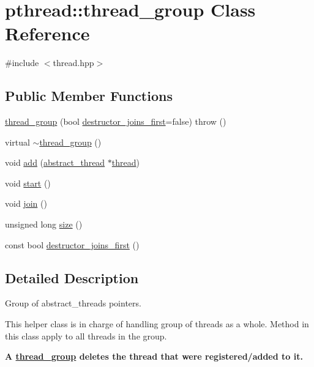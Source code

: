 \hypertarget{classpthread_1_1thread__group}{}\section{pthread\+:\+:thread\+\_\+group Class Reference}
\label{classpthread_1_1thread__group}


{\ttfamily \#include $<$thread.\+hpp$>$}

\subsection*{Public Member Functions}
\begin{DoxyCompactItemize}
\item 
\hyperlink{classpthread_1_1thread__group_a9e9881c6e01fda143a3f0080f0a196d8}{thread\+\_\+group} (bool \hyperlink{classpthread_1_1thread__group_a67df7bb484fb8657228a909a126489d3}{destructor\+\_\+joins\+\_\+first}=false)  throw ()
\item 
virtual \hyperlink{classpthread_1_1thread__group_a2aeeb86d1523e2a7c175df3162331e4f}{$\sim$thread\+\_\+group} ()
\item 
void \hyperlink{classpthread_1_1thread__group_ae9fa9ce6e7b4c2222d04a446b3c23ca0}{add} (\hyperlink{classpthread_1_1abstract__thread}{abstract\+\_\+thread} $\ast$\hyperlink{classpthread_1_1thread}{thread})
\item 
void \hyperlink{classpthread_1_1thread__group_aaba00cf80d72cd986526384482457968}{start} ()
\item 
void \hyperlink{classpthread_1_1thread__group_a39937a77e1059e352c9b39407a866f6e}{join} ()
\item 
unsigned long \hyperlink{classpthread_1_1thread__group_a4b1a04ee731bba608193b089cc1d50a1}{size} ()
\item 
const bool \hyperlink{classpthread_1_1thread__group_a67df7bb484fb8657228a909a126489d3}{destructor\+\_\+joins\+\_\+first} ()
\end{DoxyCompactItemize}


\subsection{Detailed Description}
Group of abstract\+\_\+threads pointers.

This helper class is in charge of handling group of threads as a whole. Method in this class apply to all threads in the group.

{\bfseries A \hyperlink{classpthread_1_1thread__group}{thread\+\_\+group} deletes the thread that were registered/added to it.}


